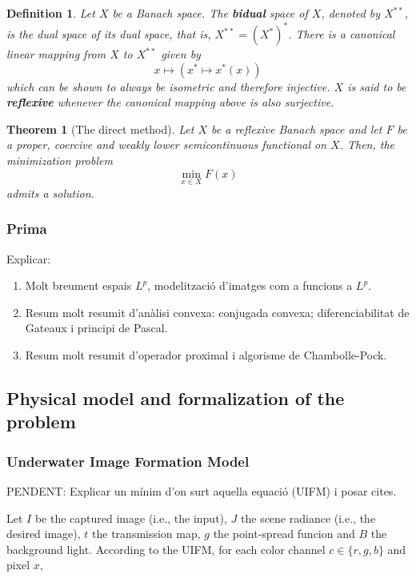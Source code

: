 \documentclass[twocolumn,twoside,a4paper,10pt]{IEEEtran}
\newtheorem{definition}{Definition}
\newtheorem{theorem}{Theorem}
\begin{document}
\begin{definition}
  Let \(X\) be a Banach space. The \textbf{bidual} space of \(X\), denoted by \(X^{**}\), is the dual space of its dual space, that is, \(X^{**}=(X^*)^*\). There is a canonical linear mapping from \(X\) to \(X^{**}\) given by
  \[
    x\mapsto(x^*\mapsto x^*(x))
  \]
  which can be shown to always be isometric and therefore injective. \(X\) is said to be \textbf{reflexive} whenever the canonical mapping above is also surjective.
\end{definition}

\begin{theorem}[The direct method]
  Let \(X\) be a reflexive Banach space and let \(F\) be a proper, coercive and weakly lower semicontinuous functional on \(X\). Then, the minimization problem
  \[
    \min_{x\in X} F(x)
  \]
  admits a solution.
\end{theorem}

\subsubsection{Prima}
Explicar:
\begin{enumerate}
  \item Molt breument espais \(L^p\), modelització d'imatges com a funcions a \(L^p\).
  \item Resum molt resumit d'anàlisi convexa: conjugada convexa; diferenciabilitat de Gateaux i principi de Pascal.
  \item Resum molt resumit d'operador proximal i algorisme de Chambolle-Pock.
\end{enumerate}

\subsection{Physical model and formalization of the problem} \label{subsec:physical-model}
\subsubsection{Underwater Image Formation Model}
PENDENT: Explicar un mínim d'on surt aquella equació (UIFM) i posar cites.

Let \(I\) be the captured image (i.e., the input), \(J\) the scene radiance (i.e., the desired image), \(t\) the transmission map, \(g\) the point-spread funcion and \(B\) the background light. According to the UIFM, for each color channel \(c\in\{r, g, b\}\) and pixel \(x\),
\end{document}
